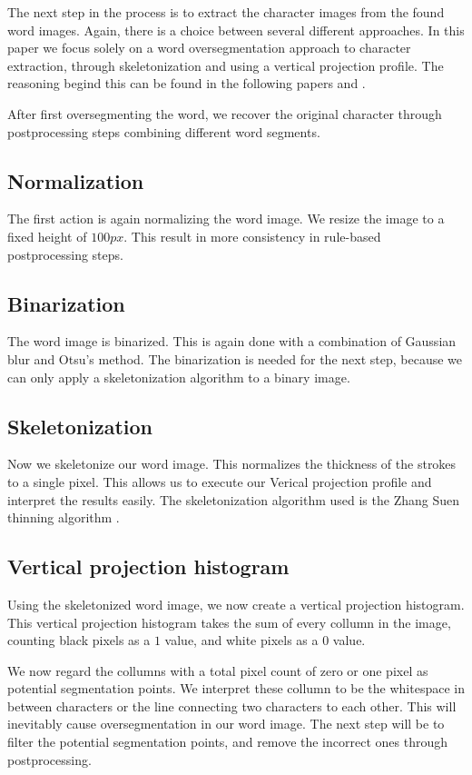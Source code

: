 \documentclass{article}
\begin{document}
The next step in the process is to extract the character images from the found word images.
Again, there is a choice between several different approaches.
In this paper we focus solely on a word oversegmentation approach to character extraction, through skeletonization and using a vertical projection profile. The reasoning begind this can be found in the following papers \cite{CharSegm} and \cite{CharSegmOld}.

After first oversegmenting the word, we recover the original character through postprocessing steps combining different word segments.

\subsection{Normalization}
The first action is again normalizing the word image.
We resize the image to a fixed height of $100px$.
This result in more consistency in rule-based postprocessing steps.

\subsection{Binarization}
The word image is binarized.
This is again done with a combination of Gaussian blur and Otsu's method.
The binarization is needed for the next step, because we can only apply a skeletonization algorithm to a binary image.


\subsection{Skeletonization}
Now we skeletonize our word image.
This normalizes the thickness of the strokes to a single pixel.
This allows us to execute our Verical projection profile and interpret the results easily.
The skeletonization algorithm used is the Zhang Suen thinning algorithm \cite{zsthinning}.

\subsection{Vertical projection histogram}
Using the skeletonized word image, we now create a vertical projection histogram.
This vertical projection histogram takes the sum of every collumn in the image, counting black pixels as a $1$ value, and white pixels as a $0$ value.

We now regard the collumns with a total pixel count of zero or one pixel as potential segmentation points.
We interpret these collumn to be the whitespace in between characters or the line connecting two characters to each other.
This will inevitably cause oversegmentation in our word image.
The next step will be to filter the potential segmentation points, and remove the incorrect ones through postprocessing.
\end{document}
